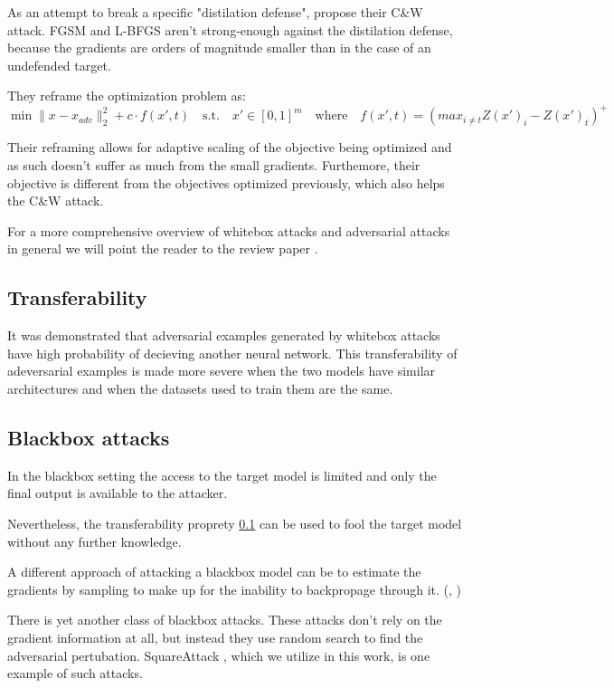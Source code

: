 As an attempt to break a specific "distilation defense", \cite{carlini2017evaluating} propose their C\&W attack. FGSM and L-BFGS aren't strong-enough against the distilation defense, because the gradients are orders of magnitude smaller than in the case of an undefended target.

They reframe the optimization problem as:
$$\min \lVert x - x_{adv} \rVert^2_2 + c \cdot f(x', t) \quad \text{s.t.} \quad x' \in [0, 1]^m \quad \text{where} \quad f(x', t) = (max_{i \neq t} Z(x')_i - Z(x')_t)^+$$

Their reframing allows for adaptive scaling of the objective being optimized and as such doesn't suffer as much from the small gradients. Furthemore, their objective is different from the objectives optimized previously, which also helps the C\&W attack.

For a more comprehensive overview of whitebox attacks and adversarial attacks in general we will point the reader to the review paper \cite{xu2019adversarial}.

\subsection{Transferability}
\label{transferability}
It was demonstrated \cite{tramer2017space} that adversarial examples generated by whitebox attacks have high probability of decieving another neural network. This transferability of adeversarial examples is made more severe when the two models have similar architectures and when the datasets used to train them are the same.


\subsection{Blackbox attacks}
\label{blackbox_attack}
In the blackbox setting the access to the target model is limited and only the final output is available to the attacker.

Nevertheless, the transferability proprety \ref{transferability} can be used to fool the target model without any further knowledge. 

A different approach of attacking a blackbox model can be to estimate the gradients by sampling to make up for the inability to backpropage through it. (\cite{Chen2017ZOOZO}, \cite{Ilyas2018BlackboxAA})

There is yet another class of blackbox attacks. These attacks don't rely on the gradient information at all, but instead they use random search to find the adversarial pertubation. SquareAttack \cite{Andriushchenko2020SquareAA}, which we utilize in this work, is one example of such attacks.

